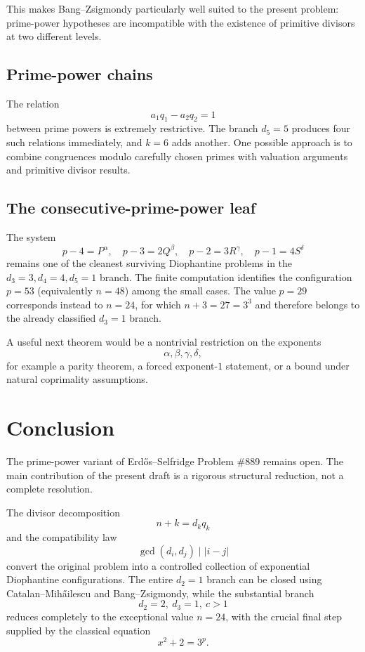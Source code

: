 \documentclass[11pt]{article}
\begin{document}
This makes Bang--Zsigmondy particularly well suited to the present problem:
prime-power hypotheses are incompatible with the existence of primitive
divisors at two different levels.

\subsection{Prime-power chains}

The relation
\[
a_1q_1-a_2q_2=1
\]
between prime powers is extremely restrictive.  The branch \(d_5=5\) produces
four such relations immediately, and \(k=6\) adds another.  One possible
approach is to combine congruences modulo carefully chosen primes with
valuation arguments and primitive divisor results.

\subsection{The consecutive-prime-power leaf}

The system
\[
p-4=P^\alpha,\quad
p-3=2Q^\beta,\quad
p-2=3R^\gamma,\quad
p-1=4S^\delta
\]
remains one of the cleanest surviving Diophantine problems in the
$d_3=3,d_4=4,d_5=1$ branch.  The finite computation identifies the
configuration $p=53$ (equivalently $n=48$) among the small cases.  The value
$p=29$ corresponds instead to $n=24$, for which $n+3=27=3^3$ and therefore
belongs to the already classified $d_3=1$ branch.

A useful next theorem would be a nontrivial restriction on the exponents
\[
\alpha,\beta,\gamma,\delta,
\]
for example a parity theorem, a forced exponent-$1$ statement, or a bound
under natural coprimality assumptions.

\section{Conclusion}

The prime-power variant of Erd\H{o}s--Selfridge Problem \#889 remains open.
The main contribution of the present draft is a rigorous structural reduction,
not a complete resolution.

The divisor decomposition
\[
n+k=d_kq_k
\]
and the compatibility law
\[
\gcd(d_i,d_j)\mid|i-j|
\]
convert the original problem into a controlled collection of exponential
Diophantine configurations.  The entire \(d_2=1\) branch can be closed using
Catalan--Mih\H ailescu and Bang--Zsigmondy, while the substantial branch
\[
d_2=2,\ d_3=1,\ c>1
\]
reduces completely to the exceptional value \(n=24\), with the crucial final
step supplied by the classical equation
\[
x^2+2=3^p.
\]
\end{document}
